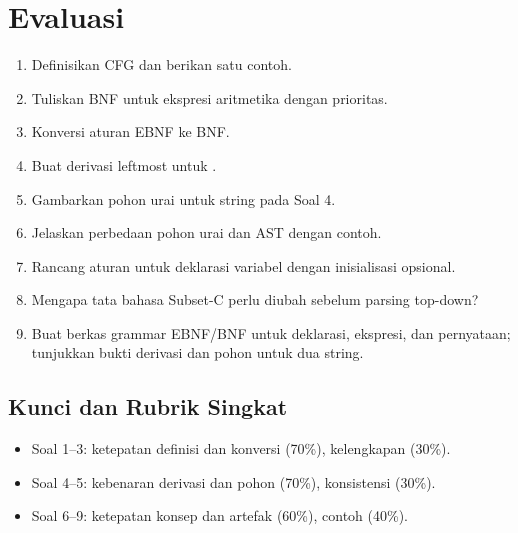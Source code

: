 \section*{Evaluasi}

\begin{enumerate}[label=\arabic*.,leftmargin=*]
  \item Definisikan CFG dan berikan satu contoh.
  \item Tuliskan BNF untuk ekspresi aritmetika dengan prioritas.
  \item Konversi aturan EBNF  ke
        BNF.
  \item Buat derivasi leftmost untuk .
  \item Gambarkan pohon urai untuk string pada Soal 4.
  \item Jelaskan perbedaan pohon urai dan AST dengan contoh.
  \item Rancang aturan untuk deklarasi variabel dengan inisialisasi
        opsional.
  \item Mengapa tata bahasa Subset-C perlu diubah sebelum parsing
        top-down?
  \item Buat berkas grammar EBNF/BNF untuk deklarasi, ekspresi, dan
        pernyataan; tunjukkan bukti derivasi dan pohon untuk dua
        string.
\end{enumerate}

\subsection*{Kunci dan Rubrik Singkat}
\begin{itemize}[leftmargin=*]
  \item Soal 1--3: ketepatan definisi dan konversi (70\%),
        kelengkapan (30\%).
  \item Soal 4--5: kebenaran derivasi dan pohon (70\%),
        konsistensi (30\%).
  \item Soal 6--9: ketepatan konsep dan artefak (60\%), contoh
        (40\%).
\end{itemize}
